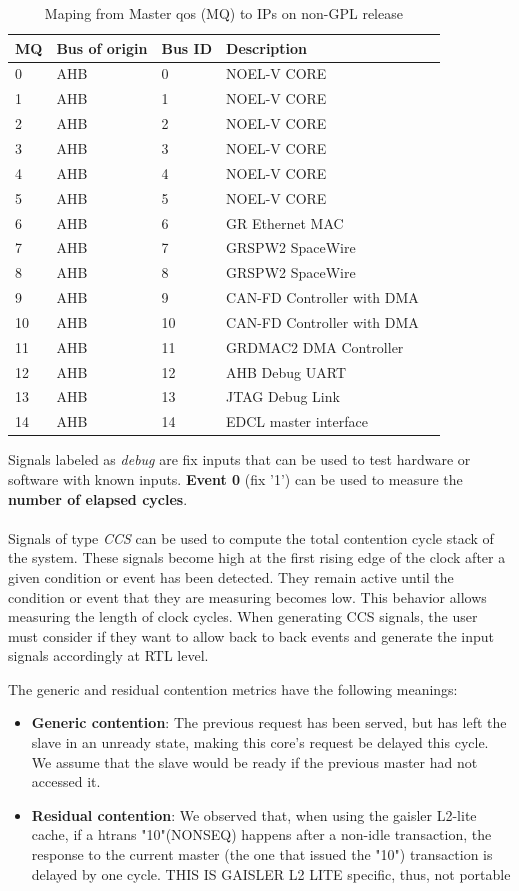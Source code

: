 \begin{table}[H]
	\caption{Maping from Master qos (MQ) to IPs on non-GPL release}
	\label{table:t_ev3}
	\centering
	\begin{tabular}{|l|l|l|l|l|}
		\hline
		\textbf{MQ} & \textbf{Bus of origin}  & \textbf{Bus ID} & \textbf{Description}\\
		\hline
0 & AHB & 0 &  NOEL-V CORE \\
1 & AHB & 1 &  NOEL-V CORE \\
2 & AHB & 2 &  NOEL-V CORE \\
3 & AHB & 3 &  NOEL-V CORE \\
4 & AHB & 4 &  NOEL-V CORE \\
5 & AHB & 5 &  NOEL-V CORE \\

6 & AHB & 6 &  GR Ethernet MAC \\
7 & AHB & 7 &  GRSPW2 SpaceWire \\
8 & AHB & 8 &  GRSPW2 SpaceWire \\
9 & AHB & 9 &  CAN-FD Controller with DMA \\
10 & AHB & 10 &  CAN-FD Controller with DMA \\
11 & AHB & 11 & GRDMAC2 DMA Controller \\
12 & AHB & 12 & AHB Debug UART  \\
13 & AHB & 13 & JTAG Debug Link   \\
14 & AHB & 14 & EDCL master interface  \\
	\hline
	\end{tabular}
\end{table}
Signals labeled as \textit{debug} are fix inputs that can be used to test hardware or software with known inputs. \textbf{Event 0} (fix '1') can be used to measure the \textbf{number of elapsed cycles}.\\
\\
Signals of type \textit{CCS} can be used to compute the total contention cycle stack of the system. These signals become high at the first rising edge of the clock after a given condition or event has been detected. They remain active until the condition or event that they are measuring becomes low. This behavior allows measuring the length of clock cycles. When generating CCS signals, the user must consider if they want to allow back to back events and generate the input signals accordingly at RTL level.

The generic and residual contention metrics have the following meanings:
\begin{itemize}
\item \textbf{Generic contention}: The previous request has been served, but has left the slave in an unready state, making this core's request be delayed this cycle. We assume that the slave would be ready if the previous master had not accessed it.
\item \textbf{Residual contention}: We observed that, when using the gaisler L2-lite cache, if a htrans "10"(NONSEQ) happens after a non-idle transaction, the response to the current master (the one that issued the "10") transaction is delayed by one cycle. THIS IS GAISLER L2 LITE specific, thus, not portable
\end{itemize}


